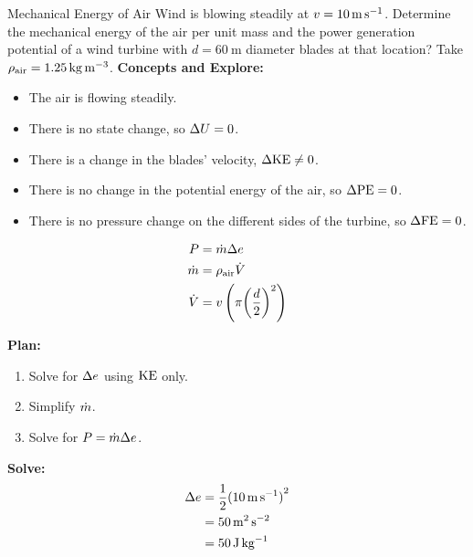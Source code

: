 \begin{example}{Mechanical Energy of Air}
  Wind is blowing steadily at $v = \SI{10}{\meter\per\second}$.
  Determine the mechanical energy of the air per unit mass and the power generation potential of a wind turbine with $d = \SI{60}{\meter}$ diameter blades at that location?
  Take $\rho_{\mathrm{air}} = \SI{1.25}{\kilo\gram\per\meter\cubed}$.
  \tcblower{}
  \textbf{Concepts and Explore:}
  \begin{itemize}[noitemsep]
  \item The air is flowing steadily.
  \item There is no state change, so $\Delta U = 0$.
  \item There is a change in the blades' velocity, $\Delta \textrm{KE} \neq 0$.
  \item There is no change in the potential energy of the air, so $\Delta \textrm{PE} = 0$.
  \item There is no pressure change on the different sides of the turbine, so $\Delta \textrm{FE} = 0$.
  \end{itemize}

  \begin{align*}
    P &= \dot{m} \Delta e \\
    \dot{m} &= \rho_{\mathrm{air}} \dot{V} \\
    \dot{V} &= v \left( \pi {\left( \frac{d}{2} \right)}^{2} \right)
  \end{align*}

  \textbf{Plan:}
  \begin{enumerate}[noitemsep]
  \item Solve for $\Delta e$ using $\textrm{KE}$ only.
  \item Simplify $\dot{m}$.
  \item Solve for $P = \dot{m} \Delta e$.
  \end{enumerate}

  \textbf{Solve:}
  \begin{align*}
    \Delta e &= \frac{1}{2} {(\SI{10}{\meter\per\second})}^{2} \\
                             &= \SI{50}{\meter\squared\per\second\squared} \\
                             &= \SI{50}{\joule\per\kilo\gram}
  \end{align*}


\end{example}
